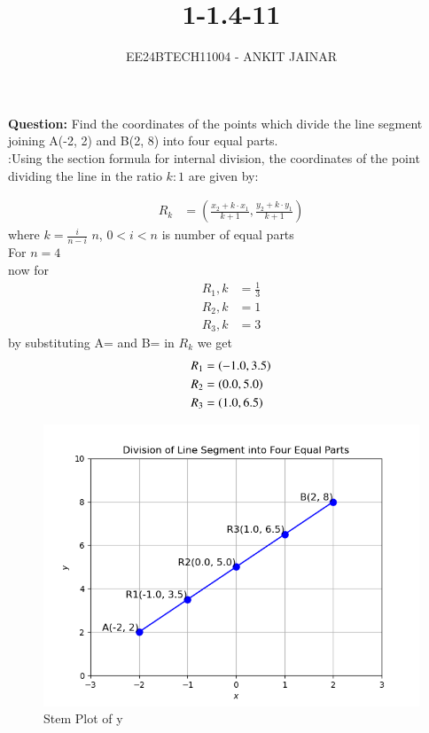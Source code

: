 \documentclass[journal]{IEEEtran}
\begin{document}

\vspace{3cm}


\title{1-1.4-11}
\author{EE24BTECH11004 - ANKIT JAINAR
}
{\let\newpage\relax\maketitle}

\renewcommand{\thefigure}{\theenumi}
\renewcommand{\thetable}{\theenumi}
\setlength{\intextsep}{10pt} %


\renewcommand{\thetable}{\theenumi}

\textbf{Question:} Find the coordinates of the points which divide the line segment joining A(-2, 2) and B(2, 8) into four equal parts.\\
\solution:Using the section formula for internal division, the coordinates of the point dividing the line in the ratio $k:1$ are given by:

\begin{align}
R_k &= \left( \frac{x_2  + k \cdot x_1}{k+1}, \frac{ y_2 + k \cdot y_1}{k+1} \right)
\end{align} 
where $k = \frac{i}{n-i}$ $n$, $0<i<n$ is number of equal parts \\
For $n = 4$ \\
now for
\begin{align}
R_1,k&=\frac{1}{3}\\
R_2,k&=1\\
R_3,k&=3
\end{align}
by substituting A= and B= in $R_k$
we get \\
\begin{align}
   R_1&=\left(-1.0,3.5\right)\\
   R_2&=\left(0.0,5.0\right)\\
   R_3&=\left(1.0,6.5\right)
\end{align}	

\begin{figure}
    \centering
    \includegraphics[width=0.5\linewidth]{figs/Figure_1.png}
    \caption{Stem Plot of y}
    \label{stemplot}
\end{figure}
\end{document}
